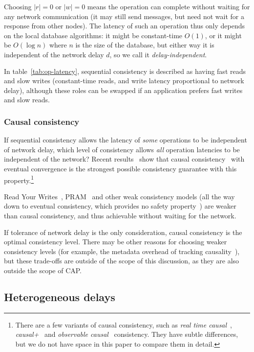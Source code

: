\documentclass[a4paper,twocolumn,10pt]{article}
\begin{document}
Choosing $|r| = 0$ or $|w| = 0$ means the operation can complete without waiting for any network
communication (it may still send messages, but need not wait for a response from other nodes). The
latency of such an operation thus only depends on the local database algorithms: it might be
constant-time $O(1)$, or it might be $O(\log n)$ where $n$ is the size of the database, but either
way it is independent of the network delay $d$, so we call it \emph{delay-independent}.

In table~\ref{tab:op-latency}, sequential consistency is described as having fast reads and slow
writes (constant-time reads, and write latency proportional to network delay), although these roles
can be swapped if an application prefers fast writes and slow reads.

\subsubsection{Causal consistency}

If sequential consistency allows the latency of \emph{some} operations to be independent of network
delay, which level of consistency allows \emph{all} operation latencies to be independent of the
network? Recent results~\cite{Attiya2015dm, Mahajan2011wz} show that causal
consistency~\cite{Ahamad1995gl} with eventual convergence is the strongest possible consistency
guarantee with this property.\footnote{There are a few variants of causal consistency, such as
\emph{real time causal}~\cite{Mahajan2011wz}, \emph{causal+}~\cite{Lloyd2011hz} and
\emph{observable causal}~\cite{Attiya2015dm} consistency. They have subtle differences, but we do
not have space in this paper to compare them in detail.}

Read Your Writes~\cite{Terry1994fp}, PRAM~\cite{Lipton1988uh} and other weak consistency models (all
the way down to eventual consistency, which provides no safety property~\cite{Bailis2013jc}) are
weaker than causal consistency, and thus achievable without waiting for the network.

If tolerance of network delay is the only consideration, causal consistency is the optimal
consistency level. There may be other reasons for choosing weaker consistency levels (for example,
the metadata overhead of tracking causality~\cite{CharronBost1991ec, Attiya2015dm}), but these
trade-offs are outside of the scope of this discussion, as they are also outside the scope of CAP.

\subsection{Heterogeneous delays}
\end{document}
